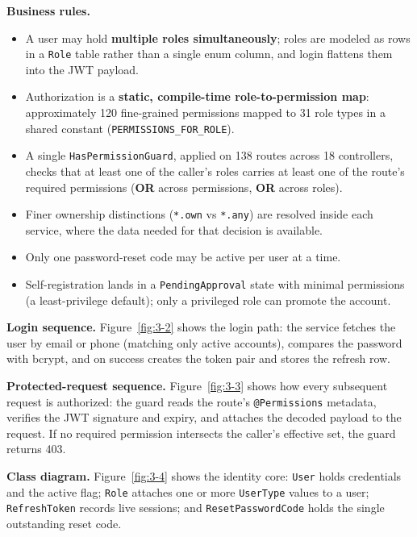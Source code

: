 \textbf{Business rules.}
\begin{itemize}
  \item A user may hold \textbf{multiple roles simultaneously}; roles are modeled as rows in a
    \texttt{Role} table rather than a single enum column, and login flattens them into the JWT
    payload.
  \item Authorization is a \textbf{static, compile-time role-to-permission map}: approximately
    120 fine-grained permissions mapped to 31 role types in a shared constant
    (\texttt{PERMISSIONS\_FOR\_ROLE}).
  \item A single \texttt{HasPermissionGuard}, applied on 138 routes across 18 controllers, checks
    that at least one of the caller's roles carries at least one of the route's required
    permissions (\textbf{OR} across permissions, \textbf{OR} across roles).
  \item Finer ownership distinctions (\texttt{*.own} vs \texttt{*.any}) are resolved inside each
    service, where the data needed for that decision is available.
  \item Only one password-reset code may be active per user at a time.
  \item Self-registration lands in a \texttt{PendingApproval} state with minimal permissions (a
    least-privilege default); only a privileged role can promote the account.
\end{itemize}

\textbf{Login sequence.} Figure~\ref{fig:3-2} shows the login path: the service fetches the user
by email or phone (matching only active accounts), compares the password with bcrypt, and on
success creates the token pair and stores the refresh row.


\textbf{Protected-request sequence.} Figure~\ref{fig:3-3} shows how every subsequent request is
authorized: the guard reads the route's \texttt{@Permissions} metadata, verifies the JWT
signature and expiry, and attaches the decoded payload to the request. If no required permission
intersects the caller's effective set, the guard returns 403.


\textbf{Class diagram.} Figure~\ref{fig:3-4} shows the identity core: \texttt{User} holds
credentials and the active flag; \texttt{Role} attaches one or more \texttt{UserType} values to a
user; \texttt{RefreshToken} records live sessions; and \texttt{ResetPasswordCode} holds the single
outstanding reset code.

